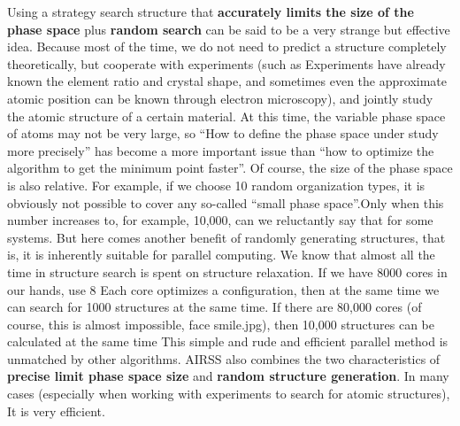\documentclass[a4paper, 10pt]{article}
\begin{document}
Using a strategy search structure that \textbf{accurately limits the size of the phase space} plus \textbf{random search} can be said to be a very strange but effective idea. Because most of the time, we do not need to predict a structure completely theoretically, but cooperate with experiments (such as Experiments have already known the element ratio and crystal shape, and sometimes even the approximate atomic position can be known through electron microscopy), and jointly study the atomic structure of a certain material. At this time, the variable phase space of atoms may not be very large, so ``How to define the phase space under study more precisely'' has become a more important issue than ``how to optimize the algorithm to get the minimum point faster''. Of course, the size of the phase space is also relative. For example, if we choose 10 random organization types, it is obviously not possible to cover any so-called ``small phase space''.Only when this number increases to, for example, 10,000, can we reluctantly say that for some systems. But here comes another benefit of randomly generating structures, that is, it is inherently suitable for parallel computing. We know that almost all the time in structure search is spent on structure relaxation. If we have 8000 cores in our hands, use 8 Each core optimizes a configuration, then at the same time we can search for 1000 structures at the same time. If there are 80,000 cores (of course, this is almost impossible, face smile.jpg), then 10,000 structures can be calculated at the same time This simple and rude and efficient parallel method is unmatched by other algorithms. AIRSS also combines the two characteristics of \textbf{precise limit phase space size} and \textbf{random structure generation}. In many cases (especially when working with experiments to search for atomic structures), It is very efficient.
\end{document}
